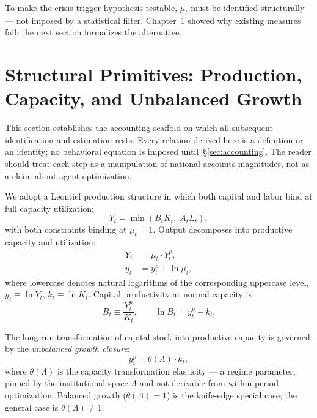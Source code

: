 \documentclass[12pt,letterpaper]{article}
\newcommand{\mut}{\mu_t}           %
\newcommand{\Yp}{Y^p_t}            %
\newcommand{\thetaL}{\theta(\Lambda)}  %
\newcommand{\Bt}{B_t}              %
\begin{document}
To make the crisis-trigger hypothesis testable, $\mut$ must be identified
structurally --- not imposed by a statistical filter. Chapter~1 showed why
existing measures fail; the next section formalizes the alternative.


\section{Structural Primitives: Production, Capacity,
  and Unbalanced Growth}
\label{sec:primitives}

This section establishes the accounting scaffold on which all subsequent
identification and estimation rests. Every relation derived here is a
definition or an identity; no behavioral equation is imposed
until~\S\ref{sec:accounting}. The reader should treat each step as a
manipulation of national-accounts magnitudes, not as a claim about agent
optimization.

We adopt a Leontief production structure in which both capital and labor bind
at full capacity utilization:
\begin{equation}
  Y_t = \min\!\left(B_t K_t,\; A_t L_t\right),
  \label{eq:leontief}
\end{equation}
with both constraints binding at $\mut = 1$. Output decomposes into
productive capacity and utilization:
\begin{align}
  Y_t &= \mut \cdot \Yp, \label{eq:decomp}\\
  y_t &= y^p_t + \ln\mut, \label{eq:decomp_log}
\end{align}
where lowercase denotes natural logarithms of the corresponding uppercase
level, $y_t \equiv \ln Y_t$, $k_t \equiv \ln K_t$.
Capital productivity at normal capacity is
\begin{equation}
  \Bt \equiv \frac{\Yp}{K_t},
  \qquad
  \ln \Bt = y^p_t - k_t.
  \label{eq:caprod}
\end{equation}

The long-run transformation of capital stock into productive capacity is
governed by the \emph{unbalanced growth closure}:
\begin{equation}
  y^p_t = \thetaL \cdot k_t,
  \label{eq:ugclosure}
\end{equation}
where $\thetaL$ is the capacity transformation elasticity — a regime
parameter, pinned by the institutional space $\Lambda$ and not derivable
from within-period optimization.
Balanced growth ($\thetaL = 1$) is the knife-edge special case;
the general case is $\thetaL \neq 1$.
\end{document}

